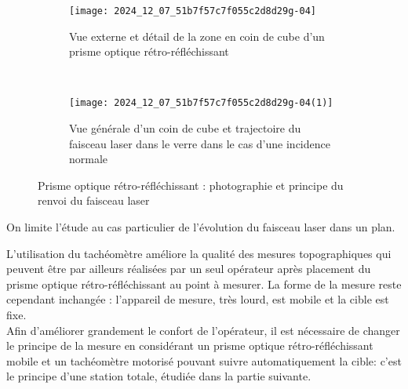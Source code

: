 \begin{figure*}[t!]
    \centering
    \begin{subfigure}[t]{0.5\textwidth}
        \centering
        \texttt{[image: 2024\_12\_07\_51b7f57c7f055c2d8d29g-04]}
        \caption{Vue externe et détail de la zone en coin de cube d'un prisme optique rétro-réfléchissant}
    \end{subfigure}%
    ~ 
    \begin{subfigure}[t]{0.5\textwidth}
        \centering
        \texttt{[image: 2024\_12\_07\_51b7f57c7f055c2d8d29g-04(1)]}
        \caption{Vue générale d'un coin de cube et trajectoire du faisceau laser dans le verre dans le cas d'une incidence normale}
    \end{subfigure}
    \caption{Prisme optique rétro-réfléchissant : photographie et principe du renvoi du faisceau laser \label{CCS_MP_2017:fig_05}}
\end{figure*}




On limite l'étude au cas particulier de l'évolution du faisceau laser dans un plan.\\

\ifprof
\begin{corrige}
\end{corrige}
\else
\fi

L'utilisation du tachéomètre améliore la qualité des mesures topographiques qui peuvent être par ailleurs réalisées par un seul opérateur après placement du prisme optique rétro-réfléchissant au point à mesurer. La forme de la mesure reste cependant inchangée : l'appareil de mesure, très lourd, est mobile et la cible est fixe.\\
Afin d'améliorer grandement le confort de l'opérateur, il est nécessaire de changer le principe de la mesure en considérant un prisme optique rétro-réfléchissant mobile et un tachéomètre motorisé pouvant suivre automatiquement la cible: c'est le principe d'une station totale, étudiée dans la partie suivante.

